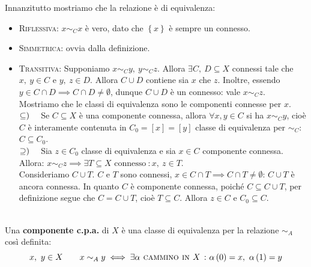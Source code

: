 \begin{demonstration}
Innanzitutto mostriamo che la relazione è di equivalenza:
\begin{itemize}
\item \textsc{Riflessiva}: $x\sim_C x$ è vero, dato che $\left\{x\right\}$ è sempre un connesso.
\item \textsc{Simmetrica}: ovvia dalla definizione.
\item \textsc{Transitiva}: Supponiamo $x\sim_C y,\ y\sim_C z$. Allora $\exists C,\ D\subseteq X$ connessi tale che $x,\ y\in C$ e $y,\ z\in D$. Allora $C\cup D$ contiene sia $x$ che $z$. Inoltre, essendo $y\in C\cap D\implies C\cap D\neq \emptyset$, dunque $C\cup D$ è un connesso: vale $x\sim_C z$.\\
Mostriamo che le classi di equivalenza sono le componenti connesse per $x$.\\
$\subseteq)\quad$ Se $C\subseteq X$ è una componente connessa, allora $\forall x, y\in C$ si ha $x\sim_C y$, cioè $C$ è interamente contenuta in $C_0=[x]=[y]$ classe di equivalenza per $\sim_C$: $C\subseteq C_0$.\\
$\supseteq)\quad$ Sia $z\in C_0$ classe di equivalenza e sia $x\in C$ componente connessa. Allora: $x\sim_C z\implies \exists T\subseteq X \text{ connesso}\ \colon x,\ z\in T$.\\
Consideriamo $C\cup T$. $C$ e $T$ sono connessi, $x\in C\cap T\implies C\cap T\neq \emptyset$: $C\cup T$ è ancora connessa. In quanto $C$ è componente connessa, poiché $C\subseteq C\cup T$, per definizione segue che $C=C\cup T$, cioè $T\subseteq C$. Allora $z\in C$ e $C_0\subseteq C$.
\end{itemize}
\vspace{-3mm}
\end{demonstration}
\begin{define}[Componente c.p.a..]~{}\\
Una \textbf{componente c.p.a.} di $X$ è una classe di equivalenza per la relazione $\sim_A$ così definita:
	\begin{equation}
	x,\ y\in X\qquad x\sim_A y\iff \exists \alpha\textsc{ cammino in }X\ \colon \alpha\left(0\right)=x,\ \alpha\left(1\right)=y
\end{equation}
\vspace{-6mm}
\end{define}
